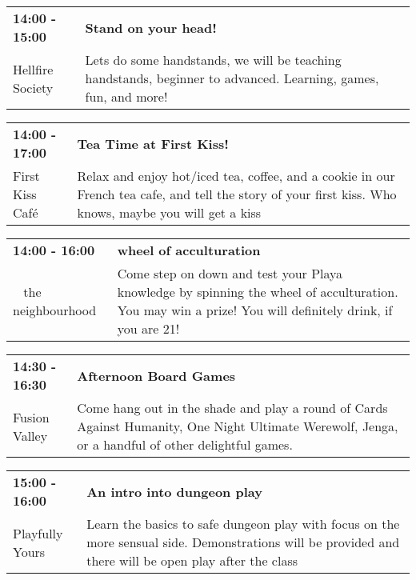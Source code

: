 \begin{tabular}{ p{1in} p{2.2in} }
    \textbf{14:00 - 15:00} & \textbf{Stand on your head!} \\
    Hellfire Society \newline  & Lets do some handstands, we will be teaching handstands, beginner to advanced. Learning, games, fun, and more! \\
    \hline 
\end{tabular}
    
\begin{tabular}{ p{1in} p{2.2in} }
    \textbf{14:00 - 17:00} & \textbf{Tea Time at First Kiss!} \\
    First Kiss Caf\'e \newline  & Relax and enjoy hot/iced tea, coffee, and a cookie in our French tea cafe, and tell the story of your first kiss. Who knows, maybe you will get a kiss \\
    \hline 
\end{tabular}
    
\begin{tabular}{ p{1in} p{2.2in} }
    \textbf{14:00 - 16:00} & \textbf{wheel of acculturation} \\
    ~ \newline the neighbourhood & Come step on down and test your Playa knowledge by spinning the wheel of acculturation. You may win a prize! You will definitely drink, if you are 21! \\
    \hline 
\end{tabular}
    
\begin{tabular}{ p{1in} p{2.2in} }
    \textbf{14:30 - 16:30} & \textbf{Afternoon Board Games} \\
    Fusion Valley \newline  & Come hang out in the shade and play a round of Cards Against Humanity, One Night Ultimate Werewolf, Jenga, or a handful of other delightful games. \\
    \hline 
\end{tabular}
    
\begin{tabular}{ p{1in} p{2.2in} }
    \textbf{15:00 - 16:00} & \textbf{An intro into dungeon play} \\
    Playfully Yours \newline  & Learn the basics to safe dungeon play with focus on the more sensual side. Demonstrations will be provided and there will be open play after the class \\
    \hline 
\end{tabular}
    
